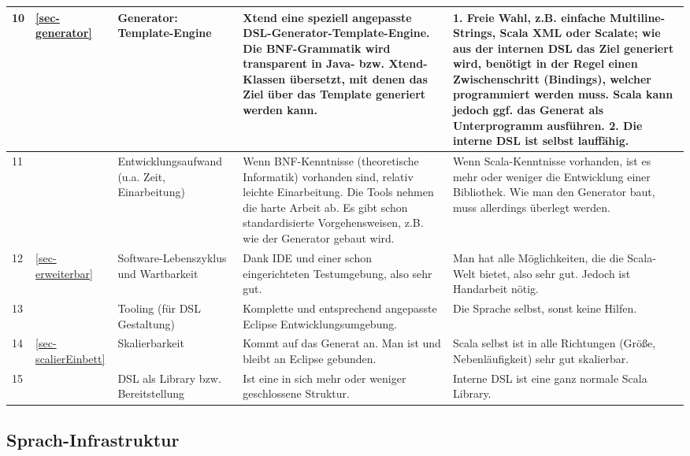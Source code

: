 \begin{landscape}
\begin{longtable}{|p{0.5cm}|p{0.8cm}|p{4.3cm}|p{6.3cm}|p{6.3cm}|}
  10
  & \ref{sec-generator}
  & Generator: Template-Engine
  & Xtend eine speziell angepasste DSL-Generator-Template-Engine.
    Die BNF-Grammatik wird transparent in Java- bzw. Xtend-Klassen übersetzt,
    mit denen das Ziel über das Template generiert werden kann.
  & 1. Freie Wahl, z.B. einfache Multiline-Strings, Scala XML oder Scalate;
    wie aus der internen DSL das Ziel generiert wird, benötigt in der Regel
    einen Zwischenschritt (Bindings), welcher programmiert werden muss.
    Scala kann jedoch ggf. das Generat als Unterprogramm ausführen.
    2. Die interne DSL ist selbst lauffähig.
  \\\hline

  11
  &
  & Entwicklungsaufwand (u.a. Zeit, Einarbeitung)
  & Wenn BNF-Kenntnisse (theoretische Informatik) vorhanden sind,
    relativ leichte Einarbeitung.
    Die Tools nehmen die harte Arbeit ab. Es gibt schon standardisierte
    Vorgehensweisen, z.B. wie der Generator gebaut wird.
  & Wenn Scala-Kenntnisse vorhanden, ist es mehr oder weniger die Entwicklung
    einer Bibliothek.
    Wie man den Generator baut, muss allerdings überlegt werden.
  \\\hline

  12
  & \ref{sec-erweiterbar}
  & Software-Lebenszyklus und Wartbarkeit
  & Dank IDE und einer schon eingerichteten Testumgebung, also sehr gut.
  & Man hat alle Möglichkeiten, die die Scala-Welt bietet, also sehr gut.
    Jedoch ist Handarbeit nötig.
  \\\hline

  13
  &
  & Tooling (für DSL Gestaltung)
  & Komplette und entsprechend angepasste Eclipse Entwicklungsumgebung.
  & Die Sprache selbst, sonst keine Hilfen.
  \\\hline

  14
  & \ref{sec-scalierEinbett}
  & Skalierbarkeit
  & Kommt auf das Generat an. Man ist und bleibt an Eclipse gebunden.
  & Scala selbst ist in alle Richtungen (Größe, Nebenläufigkeit) sehr gut
    skalierbar.
  \\\hline

  15
  &
  & DSL als Library bzw. Bereitstellung
  & Ist eine in sich mehr oder weniger geschlossene Struktur.
  & Interne DSL ist eine ganz normale Scala Library.
  \\\hline

\end{longtable}
\newpage
\end{landscape}


\subsection{Sprach-Infrastruktur}\label{sec-infrastruktur}

